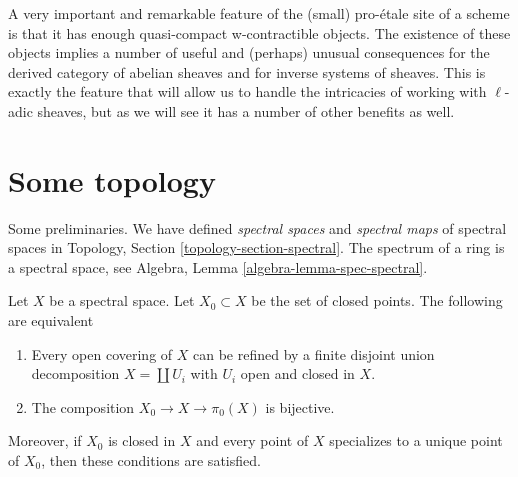 \medskip\noindent
A very important and remarkable feature of the
(small) pro-\'etale site of a scheme is
that it has enough quasi-compact w-contractible objects. The existence
of these objects implies
a number of useful and (perhaps) unusual consequences for the derived category
of abelian sheaves and for inverse systems of sheaves.
This is exactly the feature that will allow us to handle
the intricacies of working with $\ell$-adic sheaves, but as we
will see it has a number of other benefits as well.




\section{Some topology}
\label{section-topology}

\noindent
Some preliminaries. We have defined {\it spectral spaces} and
{\it spectral maps} of spectral spaces in
Topology, Section \ref{topology-section-spectral}.
The spectrum of a ring is a spectral space, see
Algebra, Lemma \ref{algebra-lemma-spec-spectral}.

\begin{lemma}
\label{lemma-spectral-split}
Let $X$ be a spectral space. Let $X_0 \subset X$ be the set of closed points.
The following are equivalent
\begin{enumerate}
\item Every open covering of $X$ can be refined by a finite
disjoint union decomposition $X = \coprod U_i$ with $U_i$
open and closed in $X$.
\item The composition $X_0 \to X \to \pi_0(X)$ is bijective.
\end{enumerate}
Moreover, if $X_0$ is closed in $X$ and every point of $X$ specializes
to a unique point of $X_0$, then these conditions are satisfied.
\end{lemma}

